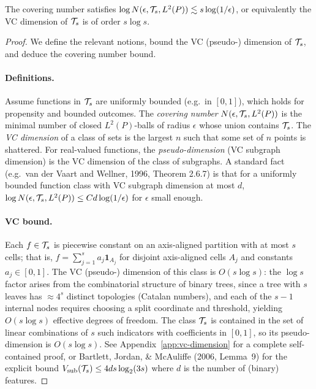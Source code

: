 \documentclass[12pt]{article}
\begin{document}
\begin{lemma}
\label{lem:complexity}
The covering number satisfies $\log N(\epsilon, \mathcal{T}_s, L^2(P)) \lesssim s \log(1/\epsilon)$, or equivalently the VC dimension of $\mathcal{T}_s$ is of order $s \log s$.
\end{lemma}
\begin{proof}
We define the relevant notions, bound the VC (pseudo-) dimension of $\mathcal{T}_s$, and deduce the covering number bound.

\paragraph{Definitions.}
Assume functions in $\mathcal{T}_s$ are uniformly bounded (e.g.\ in $[0,1]$), which holds for propensity and bounded outcomes. The \emph{covering number} $N(\epsilon, \mathcal{T}_s, L^2(P))$ is the minimal number of closed $L^2(P)$-balls of radius $\epsilon$ whose union contains $\mathcal{T}_s$. The \emph{VC dimension} of a class of sets is the largest $n$ such that some set of $n$ points is shattered. For real-valued functions, the \emph{pseudo-dimension} (VC subgraph dimension) is the VC dimension of the class of subgraphs. A standard fact (e.g.\ van der Vaart and Wellner, 1996, Theorem 2.6.7) is that for a uniformly bounded function class with VC subgraph dimension at most $d$, $\log N(\epsilon, \mathcal{T}_s, L^2(P)) \le C d \log(1/\epsilon)$ for $\epsilon$ small enough.

\paragraph{VC bound.}
Each $f \in \mathcal{T}_s$ is piecewise constant on an axis-aligned partition with at most $s$ cells; that is, $f = \sum_{j=1}^s a_j \mathbf{1}_{A_j}$ for disjoint axis-aligned cells $A_j$ and constants $a_j \in [0,1]$. The VC (pseudo-) dimension of this class is $O(s \log s)$: the $\log s$ factor arises from the combinatorial structure of binary trees, since a tree with $s$ leaves has $\approx 4^s$ distinct topologies (Catalan numbers), and each of the $s-1$ internal nodes requires choosing a split coordinate and threshold, yielding $O(s \log s)$ effective degrees of freedom. The class $\mathcal{T}_s$ is contained in the set of linear combinations of $s$ such indicators with coefficients in $[0,1]$, so its pseudo-dimension is $O(s \log s)$. See Appendix~\ref{app:vc-dimension} for a complete self-contained proof, or Bartlett, Jordan, \& McAuliffe (2006, Lemma~9) for the explicit bound $V_{\text{sub}}(\mathcal{T}_s) \le 4ds \log_2(3s)$ where $d$ is the number of (binary) features.


\end{proof}
\end{document}
